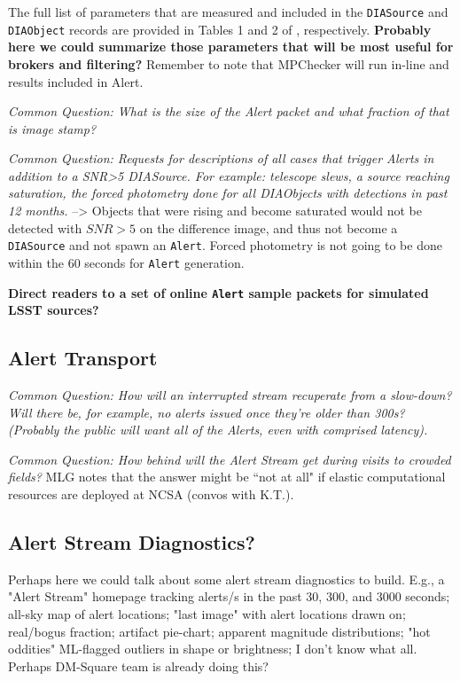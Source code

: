 The full list of parameters that are measured and included in the {\tt DIASource} and {\tt DIAObject} records are provided in Tables 1 and 2 of , respectively. {\bf Probably here we could summarize those parameters that will be most useful for brokers and filtering?} Remember to note that MPChecker will run in-line and results included in Alert.

{\it Common Question: What is the size of the Alert packet and what fraction of that is image stamp?}

{\it Common Question: Requests for descriptions of all cases that trigger Alerts in addition to a SNR>5 DIASource. For example: telescope slews, a source reaching saturation, the forced photometry done for all DIAObjects with detections in past 12 months.}
--> Objects that were rising and become saturated would not be detected with $SNR>5$ on the difference image, and thus not become a {\tt DIASource} and not spawn an {\tt Alert}. Forced photometry is not going to be done within the 60 seconds for {\tt Alert} generation.

{\bf Direct readers to a set of online {\tt Alert} sample packets for simulated LSST sources?}


\subsection{Alert Transport}

{\it Common Question: How will an interrupted stream recuperate from a slow-down? Will there be, for example, no alerts issued once they're older than 300s? (Probably the public will want all of the Alerts, even with comprised latency).}

{\it Common Question: How behind will the Alert Stream get during visits to crowded fields?} MLG notes that the answer might be ``not at all" if elastic computational resources are deployed at NCSA (convos with K.T.).


\subsection{Alert Stream Diagnostics?}

Perhaps here we could talk about some alert stream diagnostics to build. E.g., a "Alert Stream" homepage tracking alerts/s in the past 30, 300, and 3000 seconds; all-sky map of alert locations; "last image" with alert locations drawn on; real/bogus fraction; artifact pie-chart; apparent magnitude distributions; "hot oddities" ML-flagged outliers in shape or brightness; I don't know what all. Perhaps DM-Square team is already doing this?


